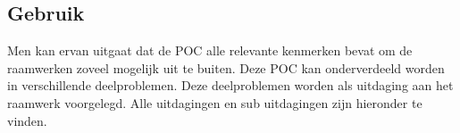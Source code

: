 \subsection{Gebruik}
\label{sec:vergelijking-gebruik}

Men kan ervan uitgaat dat de POC alle relevante kenmerken bevat om de raamwerken zoveel mogelijk uit te buiten. 
Deze POC kan onderverdeeld worden in verschillende deelproblemen.
Deze deelproblemen worden als uitdaging aan het raamwerk voorgelegd.
Alle uitdagingen en sub uitdagingen zijn hieronder te vinden.

